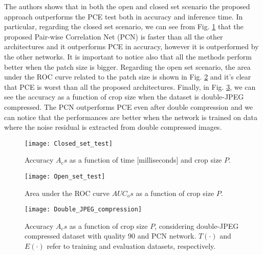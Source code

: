 The authors shows that in both the open and closed set scenario the proposed approach outperforms the PCE test both in accuracy 
and inference time. In particular, regarding the closed set scenario, we can see from Fig. \ref{fig:Closed_set_test} 
that the proposed Pair-wise Correlation Net (PCN) is faster than all the 
other architectures and it outperforms PCE in accuracy, however it is outperformed by the other networks. It is important to notice 
also that all the methods perform better when the patch size is bigger.
Regarding the open set scenario, the area under the ROC curve related to the patch size is shown in Fig. \ref{fig:Open_set_test}  and it's clear that 
PCE is worst than all the proposed architectures. 
Finally, in Fig. \ref{fig:Double_JPEG_compression}, we can see the accuracy as a function of crop size when the dataset is double-JPEG compressed. 
The PCN outperforms PCE even after double compression and we can notice that the performances are better when the network is trained on 
data where the noise residual is extracted from double compressed images.

\begin{figure}[t!]
    \centering
    \texttt{[image: Closed\_set\_test]}
    \caption{Accuracy $A_cs$ as a function of time [milliseconds] and crop size $P$.}
    \label{fig:Closed_set_test}
\end{figure}

\begin{figure}[t!]
    \centering
    \texttt{[image: Open\_set\_test]}
    \caption{Area under the ROC curve $AUC_os$ as a function of crop size $P$.}
    \label{fig:Open_set_test}
\end{figure}

\begin{figure}[t!]
    \centering
    \texttt{[image: Double\_JPEG\_compression]}
    \caption{Accuracy $A_cs$ as a function of crop size $P$, considering double-JPEG
    compressed dataset with quality 90 and PCN network. $T(·)$ and $E(·)$ refer
    to training and evaluation datasets, respectively.}
    \label{fig:Double_JPEG_compression}
\end{figure}